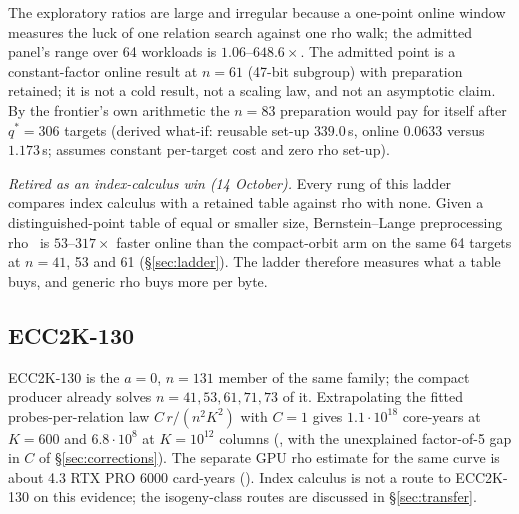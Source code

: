 The exploratory ratios are large and irregular because a one-point online
window measures the luck of one relation search against one rho walk; the
admitted panel's range over 64 workloads is $1.06$--$648.6\times$. The
admitted point is a constant-factor online result at $n=61$ (47-bit
subgroup) with preparation retained; it is not a cold result, not a
scaling law, and not an asymptotic claim. By the frontier's own arithmetic
the $n=83$ preparation would pay for itself after $q^*=306$ targets
(derived what-if: reusable set-up $339.0$\,s, online $0.0633$ versus
$1.173$\,s; assumes constant per-target cost and zero rho set-up).

\emph{Retired as an index-calculus win (14 October).} Every rung of this
ladder compares index calculus with a retained table against rho with
none. Given a distinguished-point table of equal or smaller size,
Bernstein--Lange preprocessing rho~\cite{bl2012} is $53$--$317\times$
faster online than the compact-orbit arm on the same 64 targets at $n=41$,
53 and 61 (\S\ref{sec:ladder}). The ladder therefore measures what a
table buys, and generic rho buys more per byte.

\subsection{ECC2K-130}\label{sec:ecc2k130}

ECC2K-130 is the $a=0$, $n=131$ member of the same family; the compact
producer already solves $n=41,53,61,71,73$ of it. Extrapolating the fitted
probes-per-relation law $C\,r/(n^2K^2)$ with $C=1$ gives
$1.1\cdot10^{18}$ core-years at $K=600$ and $6.8\cdot10^{8}$ at
$K=10^{12}$ columns (, with the
unexplained factor-of-5 gap in $C$ of \S\ref{sec:corrections}). The
separate GPU rho estimate for the same curve is about 4.3 RTX PRO 6000
card-years (). Index calculus is not a route to
ECC2K-130 on this evidence; the isogeny-class routes are discussed in
\S\ref{sec:transfer}.
